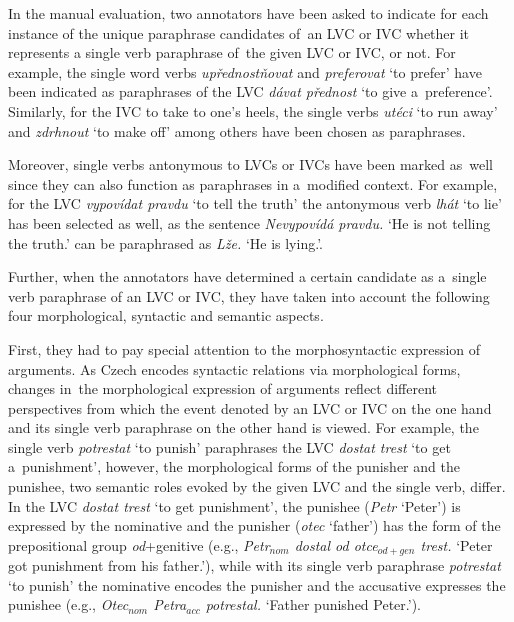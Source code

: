 \documentclass[output=paper
,modfonts
,nonflat]{langsci/langscibook}
\begin{document}
In the manual evaluation, two annotators have been asked to indicate for each 
instance of the unique paraphrase candidates of~an LVC or IVC whether it 
represents a single verb paraphrase of~the given LVC or IVC, or not. For 
example, the single word verbs \textit{upřednostňovat} and \textit{preferovat} 
`to prefer'  have been indicated as paraphrases of the LVC \textit{dávat přednost} 
`to give a~preference'. Similarly, for the IVC  
{to take to one's heels}, the single verbs 
\textit{utéci} `to run away' and \textit{zdrhnout} `to make off' among others 
have been chosen as paraphrases.

Moreover, single verbs antonymous to LVCs or IVCs have been marked as~well 
since they can also function as paraphrases in a~modified context. 
For example, for the LVC \textit{vypovídat pravdu} `to tell the truth' the 
antonymous verb \textit{lhát} `to lie' has been selected as well, as the sentence  
\textit{Nevypovídá pravdu.} `He is not telling the truth.' can be paraphrased 
as \textit{Lže.} `He is lying.'.

Further, when the annotators have determined a certain candidate as a~single 
verb paraphrase of an LVC or IVC, they have taken into account the following 
four morphological, syntactic and semantic aspects. 

First, they had to pay special attention to the morphosyntactic expression of 
arguments. As Czech encodes syntactic relations via morphological forms, 
changes in~the morphological expression of arguments reflect different 
perspectives from which the event denoted by an LVC or IVC on the one hand
and its single verb paraphrase on the other hand is viewed. 
For example, the single verb \textit{potrestat} `to punish' paraphrases 
the LVC \textit{dostat trest} `to get a~punishment', however, 
the morphological forms of the punisher and the punishee, two semantic roles 
evoked by the given LVC and the single verb, differ. In the LVC \textit{dostat 
trest} `to get punishment', the punishee (\textit{Petr} `Peter') is expressed 
by the nominative and the punisher (\textit{otec} `father') 
has the form of the prepositional group \textit{od}+genitive
(e.g., \textit{Petr$_{nom}$ dostal od otce$_{od+gen}$ trest.} `Peter got punishment from his father.'), while with its single verb paraphrase \textit{potrestat} `to punish'
the nominative encodes the punisher and the accusative expresses the punishee (e.g., \textit{Otec$_{nom}$ Petra$_{acc}$ potrestal.} `Father punished Peter.').
\end{document}
